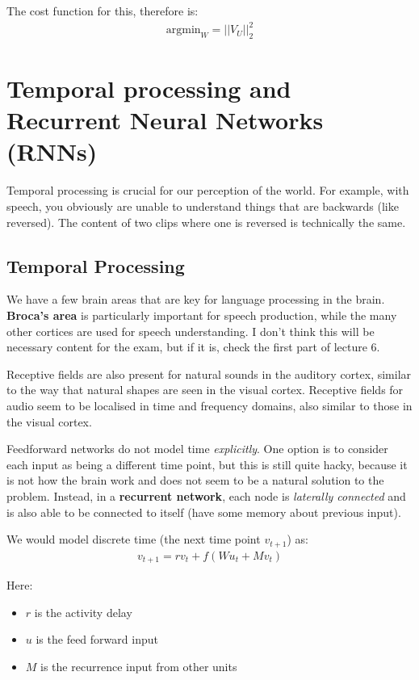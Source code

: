 \documentclass[11pt,a4paper,titlepage,dvipsnames,cmyk]{scrartcl}
\begin{document}
The cost function for this, therefore is:
\begin{align*}
\text{argmin}_W = ||V_U||^2_2
\end{align*}

\section{Temporal processing and Recurrent Neural Networks (RNNs)}
Temporal processing is crucial for our perception of the world. For example, with speech, you obviously are unable to understand things that are backwards (like reversed). The content of two clips where one is reversed is technically the same.

\subsection{Temporal Processing}
We have a few brain areas that are key for language processing in the brain. \textbf{Broca's area} is particularly important for speech production, while the many other cortices are used for speech understanding. I don't think this will be necessary content for the exam, but if it is, check the first part of lecture 6.

Receptive fields are also present for natural sounds in the auditory cortex, similar to the way that natural shapes are seen in the visual cortex. Receptive fields for audio seem to be localised in time and frequency domains, also similar to those in the visual cortex.

Feedforward networks do not model time \textit{explicitly}. One option is to consider each input as being a different time point, but this is still quite hacky, because it is not how the brain work and does not seem to be a natural solution to the problem. Instead, in a \textbf{recurrent network}, each node is \textit{laterally connected} and is also able to be connected to itself (have some memory about previous input). 

We would model discrete time (the next time point $v_{t+1}$) as:
\begin{align*}
v_{t+1} = rv_t + f(Wu_t + Mv_t)
\end{align*}

Here:
\begin{itemize}
    \item $r$ is the activity delay
    \item $u$ is the feed forward input
    \item $M$ is the recurrence input from other units
\end{itemize}
\end{document}
